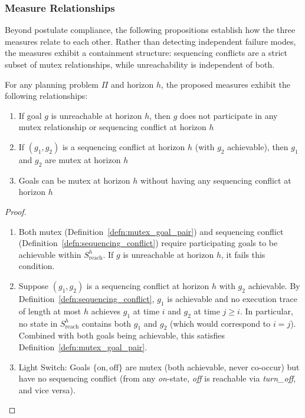 \subsubsection{Measure Relationships}
\label{sec:measure_relationships}

Beyond postulate compliance, the following propositions establish how the three measures relate to each other. Rather than detecting independent failure modes, the measures exhibit a containment structure: sequencing conflicts are a strict subset of mutex relationships, while unreachability is independent of both.
\pagebreak
\begin{prop}
    \label{prop:measure_relationships}
    For any planning problem $\Pi$ and horizon $h$, the proposed measures exhibit the following relationships:
    \begin{enumerate}
        \item If goal $g$ is unreachable at horizon $h$, then $g$ does not participate in any mutex relationship or sequencing conflict at horizon $h$
        \item If $(g_1, g_2)$ is a sequencing conflict at horizon $h$ (with $g_2$ achievable), then $g_1$ and $g_2$ are mutex at horizon $h$
        \item Goals can be mutex at horizon $h$ without having any sequencing conflict at horizon $h$
    \end{enumerate}
\end{prop}
\begin{proof}
    \begin{enumerate}
        \item Both mutex (Definition~\ref{defn:mutex_goal_pair}) and sequencing conflict (Definition~\ref{defn:sequencing_conflict}) require participating goals to be achievable within $S^h_{\text{reach}}$. If $g$ is unreachable at horizon $h$, it fails this condition.
        \item Suppose $(g_1, g_2)$ is a sequencing conflict at horizon $h$ with $g_2$ achievable. By Definition~\ref{defn:sequencing_conflict}, $g_1$ is achievable and no execution trace of length at most $h$ achieves $g_1$ at time $i$ and $g_2$ at time $j \geq i$. In particular, no state in $S^h_{\text{reach}}$ contains both $g_1$ and $g_2$ (which would correspond to $i = j$). Combined with both goals being achievable, this satisfies Definition~\ref{defn:mutex_goal_pair}.
        \item Light Switch: Goals $\{\text{on}, \text{off}\}$ are mutex (both achievable, never co-occur) but have no sequencing conflict (from any \textit{on}-state, \textit{off} is reachable via \textit{turn\_off}, and vice versa).
    \end{enumerate}
\end{proof}

